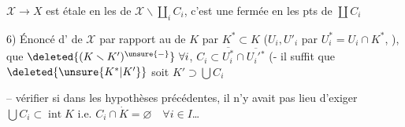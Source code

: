 $\mathcal X\longrightarrow X$ est étale en les  de $\mathcal X\smallsetminus\coprod_i C_i$, c'est une  fermée en les pts de $\coprod C_i$

6) Énoncé d' de $\mathcal X$ par rapport au  de $K$ par $K^*\subset K$ ($U_i,U'_i$ par $U_i^*=U_i\cap K^*$, ),  que
  $\deleted{(K\smallsetminus K')^{\unsure{-}}}\ \forall i$, $C_i\subset\overline{U_i^*}\cap\overline{U_i'{}^*}$ (- il suffit que $\deleted{\unsure{K^*|K'}}$ soit $K'\supset\bigcup C_i$

-- vérifier si dans les  hypothèses précédentes, il n'y avait pas lieu d'exiger $\bigcup C_i\subset\operatorname{int}K$ i.e. $C_i\cap\dot K=\varnothing\quad\forall i\in I$\ldots
{}

